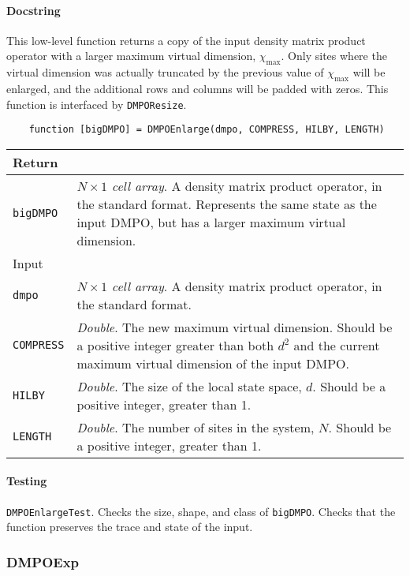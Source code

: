  \paragraph{Docstring} This low-level function returns a copy of the input density matrix product operator with a larger maximum virtual dimension, \(\chi_{\mathrm{max}}\). Only sites where the virtual dimension was actually truncated by the previous value of \(\chi_{\mathrm{max}}\) will be enlarged, and the additional rows and columns will be padded with zeros. This function is interfaced by \lstinline$DMPOResize$.
 \begin{lstlisting} 
 	function [bigDMPO] = DMPOEnlarge(dmpo, COMPRESS, HILBY, LENGTH) \end{lstlisting}
 \begin{longtabu}{X[1,1]X[4,1]}
 \hline
 Return & \\ \hline
 \lstinline$bigDMPO$ & \emph{\(N \times 1\) cell array}. A density matrix product operator, in the standard format. Represents the same state as the input DMPO, but has a larger maximum virtual dimension. \\ \hline
 Input & \\ \hline
 \lstinline$dmpo$ & \emph{\(N \times 1\) cell array}. A density matrix product operator, in the standard format. \\
 \lstinline$COMPRESS$ & \emph{Double}. The new maximum virtual dimension. Should be a positive integer greater than both \(d^{2}\) and the current maximum virtual dimension of the input DMPO. \\
 \lstinline$HILBY$ & \emph{Double}. The size of the local state space, \(d\). Should be a positive integer, greater than 1. \\
 \lstinline$LENGTH$ & \emph{Double}. The number of sites in the system, \(N\). Should be a positive integer, greater than 1. \\
 \hline
 \end{longtabu}
 \paragraph{Testing} \lstinline$DMPOEnlargeTest$. Checks the size, shape, and class of \lstinline$bigDMPO$. Checks that the function preserves the trace and state of the input. 
 
 \subsubsection{DMPOExp}
